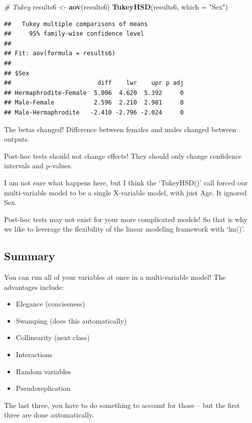 \documentclass[
]{article}
\newenvironment{Shaded}{\begin{snugshade}}{\end{snugshade}}
\newcommand{\AttributeTok}[1]{\textcolor[rgb]{0.13,0.29,0.53}{#1}}
\newcommand{\CommentTok}[1]{\textcolor[rgb]{0.56,0.35,0.01}{\textit{#1}}}
\newcommand{\FunctionTok}[1]{\textcolor[rgb]{0.13,0.29,0.53}{\textbf{#1}}}
\newcommand{\NormalTok}[1]{#1}
\newcommand{\OtherTok}[1]{\textcolor[rgb]{0.56,0.35,0.01}{#1}}
\newcommand{\StringTok}[1]{\textcolor[rgb]{0.31,0.60,0.02}{#1}}
\providecommand{\tightlist}{%
  \setlength{\itemsep}{0pt}\setlength{\parskip}{0pt}}
\begin{document}
\begin{Shaded}
\begin{Highlighting}[]
\CommentTok{\# Tukey}
\NormalTok{results6 }\OtherTok{\textless{}{-}} \FunctionTok{aov}\NormalTok{(results6)}
\FunctionTok{TukeyHSD}\NormalTok{(results6, }\AttributeTok{which =} \StringTok{"Sex"}\NormalTok{)}
\end{Highlighting}
\end{Shaded}

\begin{verbatim}
##   Tukey multiple comparisons of means
##     95% family-wise confidence level
## 
## Fit: aov(formula = results6)
## 
## $Sex
##                        diff    lwr    upr p adj
## Hermaphrodite-Female  5.006  4.620  5.392     0
## Male-Female           2.596  2.210  2.981     0
## Male-Hermaphrodite   -2.410 -2.796 -2.024     0
\end{verbatim}

The betas changed! Difference between females and males changed between
outputs.

Post-hoc tests should not change effects! They should only change
confidence intervals and p-values.

I am not sure what happens here, but I think the `TukeyHSD()' call
forced our multi-variable model to be a single X-variable model, with
just Age. It ignored Sex.

Post-hoc tests may not exist for your more complicated models! So that
is why we like to leverage the flexibility of the linear modeling
framework with `lm()'.

\subsection{Summary}\label{summary}

You can run all of your variables at once in a multi-variable model! The
advantages include:

\begin{itemize}
\tightlist
\item
  Elegance (conciseness)
\item
  Swamping (does this automatically)
\item
  Collinearity (next class)
\item
  Interactions
\item
  Random variables
\item
  Pseudoreplication
\end{itemize}

The last three, you have to do something to account for those -- but the
first three are done automatically.
\end{document}
